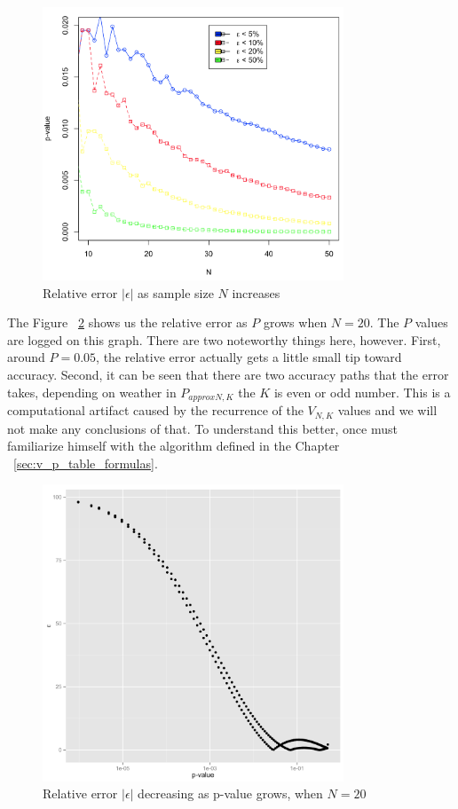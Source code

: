 \documentclass[12pt]{article}
\begin{document}
{\begin{figure}[H]
  \centering
  \includegraphics[width=0.8\textwidth]{PvsN}
  \caption{Relative error $|\epsilon|$ as sample size $N$ increases}
  \label{fig:PvsN}
\end{figure}

The Figure ~\ref{fig:RelativeErrorDecresingPgrows} shows us the relative error as $P$ grows when $N = 20$. The $P$ values are logged on this graph. There are two noteworthy things here, however. First, around $P = 0.05$, the relative error actually gets a little small tip toward accuracy. Second, it can be seen that there are two accuracy paths that the error takes, depending on weather in $P_{approx N, K}$  the $K$ is even or odd number. This is a computational artifact caused by the recurrence of the $V_{N, K}$ values and we will not make any conclusions of that. To understand this better, once must familiarize himself with the algorithm defined in the Chapter ~\ref{sec:v_p_table_formulas}.


\begin{figure}[H]
	\centering
  \includegraphics[width=0.8\textwidth]{RelativeErrorDecreasingPgrowsN20}
	\caption{Relative error $|\epsilon|$ decreasing as p-value grows, when $N=20$}
	\label{fig:RelativeErrorDecresingPgrows}
\end{figure}

}
\end{document}
